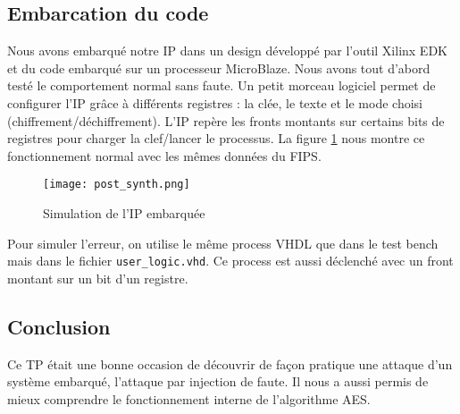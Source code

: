 \subsection{Embarcation du code}
Nous avons embarqué notre IP dans un design développé par l'outil Xilinx EDK
et du code embarqué sur un processeur MicroBlaze. Nous avons tout d'abord testé
le comportement normal sans faute. Un petit morceau logiciel permet de configurer
l'IP grâce à différents registres : la clée, le texte et le mode
choisi (chiffrement/déchiffrement). L'IP repère les fronts montants sur certains
bits de registres pour charger la clef/lancer le processus. La figure \ref{post}
nous montre ce fonctionnement normal avec les mêmes données du FIPS. \\
\begin{figure}[htbp]
	\begin{center}
	\texttt{[image: post\_synth.png]}
	\caption{Simulation de l'IP embarquée}
	\label{post}
	\end{center}
\end{figure}
Pour simuler l'erreur, on utilise le même process VHDL que dans le test bench
mais dans le fichier \texttt{user\_logic.vhd}. Ce process est aussi déclenché
avec un front montant sur un bit d'un registre.


\subsection{Conclusion}
Ce TP était une bonne occasion de découvrir de façon pratique une attaque
d'un système embarqué, l'attaque par injection de faute.
Il nous a aussi permis de mieux comprendre le fonctionnement interne de
l'algorithme AES.
